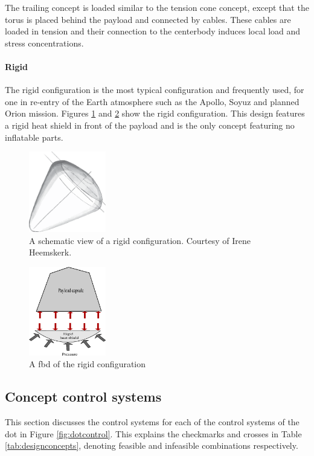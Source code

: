 The trailing concept is loaded similar to the tension cone concept, except that the torus is placed behind the payload and connected by cables. These cables are loaded in tension and their connection to the centerbody induces local load and stress concentrations.

\paragraph{Rigid}

The rigid configuration is the most typical configuration and frequently used, for one in re-entry of the Earth atmosphere such as the Apollo, Soyuz and planned Orion mission. Figures \ref{fig:conc_rigid} and \ref{fig:fbd_rigid} show the rigid configuration. This design features a rigid heat shield in front of the payload and is the only concept featuring no inflatable parts.

\begin{figure}[H]
\centering
\includegraphics[angle=180, width = 0.3\textwidth]{Figure/rigid.eps}
\caption{A schematic view of a rigid configuration. Courtesy of Irene Heemskerk.}
\label{fig:conc_rigid}
\end{figure}

\begin{figure}[H]
\centering
\includegraphics[width = 0.3\textwidth]{Figure/FBD_rigid.eps}
\caption{A \gls{fbd} of the rigid configuration}
\label{fig:fbd_rigid}
\end{figure}

\subsection{Concept control systems} \label{sec:ccs}
This section discusses the control systems for each of the control systems of the \gls{dot} in Figure  \ref{fig:dotcontrol}. This explains the checkmarks and crosses in Table \ref{tab:designconcepts}, denoting feasible and infeasible combinations respectively.

